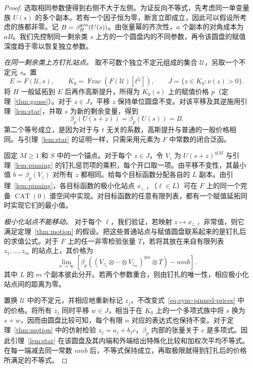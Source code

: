 \begin{proof}
选取相同参数便得到右侧不大于左侧。为证反向不等式，先考虑同一单变量族 $U(s)$ 的多个副本。若有一个因子恒为零，断言立即成立，因此可以假设所考虑的族都非零。记 $B=\beta_H^{\rm gen}(U(s))$。由张量幂的齐次性，$a$ 个副本的对角成本为 $aB$。我们先控制同一剩余类 $s$ 上方的一个圆盘内的不同参数，再令该圆盘的赋值深度趋于零以恢复独立参数。

\smallskip\noindent\emph{在同一剩余类上方钉扎站点。}
取不可数个独立不定元组成的集合 $\mathcal U$，另取一个不定元 $s$。置
\[
 E=F(\mathcal U,s),\qquad
 K_0=\operatorname{Frac}(F(\mathcal U)[t^{\mathbb Q}]),\qquad
 J=\{z\in K_0:\nu(z)>0\}.
\]
将 $H$ 一般延拓到 $E$ 后再作高斯提升，所得为 $K_0(s)$ 上的赋值价格 $p$（定理~\ref{thm:gauss}）。对于 $z\in J$，平移 $z$ 保持单位圆盘不变。对该平移及其逆施用引理~\ref{lem:star}，并取 $s$ 为新的剩余变量，得到
\begin{equation}\label{eq:sync-disk-single}
     \beta_p(U(s+z))=\beta_p(U(s))=B .
\end{equation}
第二个等号成立，是因为对于与 $t$ 无关的系数，高斯提升与普通的一般价格相同。与引理~\ref{lem:star} 的证明一样，只需采用元素为 $F$ 中常数的闭合泛函。

固定 $M\ge1$ 和 $S$ 中的一个锚点。对于每个 $z\in J$，令 $V_z$ 为 $U(s+z)^{\otimes M}$ 与引理~\ref{lem:pinning} 的钉扎惩罚项的乘积，每个开口取一项。由平移不变性，其最小值 $b=\beta_p(V_z)$ 对所有 $z$ 都相同。给每个目标函数分配各自的 $L$ 副本。由引理~\ref{lem:pinning}，各目标函数的极小化站点 $x_{z,\ell}$（$\ell\in L$）可在 $F$ 上的同一个完备 $\operatorname{CAT}(0)$ 谱空间中实现。对目标函数的任意有限列表，都有一个赋值延拓同时实现它们的最小值。

\smallskip\noindent\emph{极小化站点不能移动。}
对于每个 $\ell$，我们验证，若映射 $z\mapsto x_{z,\ell}$ 非常值，则它满足定理~\ref{thm:motion} 的假设。把这些普通站点与赋值圆盘联系起来的是钉扎后的求值公式。对于 $F$ 上的任一非零检验张量 $T$，若将其放在来自有限列表 $z_1,\ldots,z_m$ 的站点上，其价格为
\begin{equation}\label{eq:sync-pinned-prices}
 \lim_{n\to\infty}
 \left[
 \beta_p\!\left(
  (V_{z_1}\otimes\cdots\otimes V_{z_m})^{\otimes n}\otimes T
 \right)-nmb
 \right].
\end{equation}
其中 $L$ 的 $m$ 个副本彼此分开。若两个参数重合，则由钉扎的唯一性，相应极小化站点间的距离为零。

置换 $\mathcal U$ 中的不定元，并相应地重新标记 $z_j$，不改变式~\eqref{eq:sync-pinned-prices} 中的价格。将所有 $z_j$ 同时平移 $w\in J$，相当于在 $K_0$ 上的一个多项式族中将 $s$ 换为 $s+w$，因而由圆盘比较可知，每个有限 $n$ 对应的表达式也保持不变。对于定理~\ref{thm:motion} 中的仿射检验 $z_j=a_j+b_jc$，$\beta_p$ 内部的张量关于 $c$ 是多项式。因此引理~\ref{lem:star} 在该圆盘及其内端和外端给出特殊化比较和加权次平均不等式。在每一端减去同一常数 $nmb$ 后，不等式保持成立，再取极限就得到钉扎后的价格所满足的不等式。


\end{proof}
